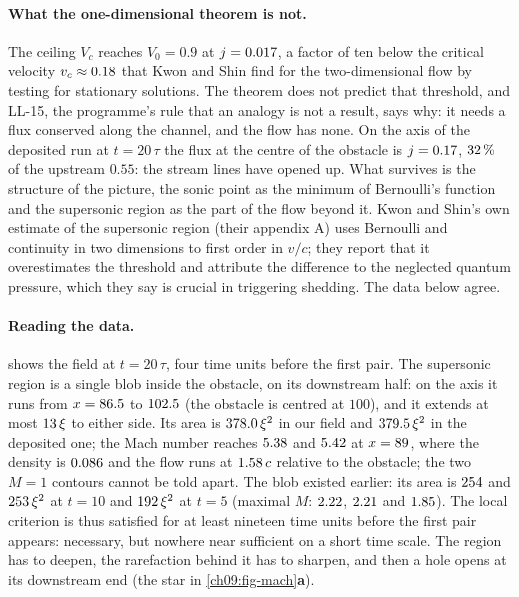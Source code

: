 \paragraph{What the one-dimensional theorem is not.} The ceiling $V_c$ reaches $V_0=0.9$ at $j=0.017$, a factor of ten below the critical velocity $v_c\approx0.18$ that Kwon and Shin find for the two-dimensional flow by testing for stationary solutions. The theorem does not predict that threshold, and LL-15, the programme's rule that an analogy is not a result, says why: it needs a flux conserved along the channel, and the flow has none. On the axis of the deposited run at $t=20\,\tau$ the flux at the centre of the obstacle is $j=0.17$, $32\,\%$ of the upstream $0.55$: the stream lines have opened up. What survives is the structure of the picture, the sonic point as the minimum of Bernoulli's function and the supersonic region as the part of the flow beyond it. Kwon and Shin's own estimate of the supersonic region (their appendix A) uses Bernoulli and continuity in two dimensions to first order in $v/c$; they report that it overestimates the threshold and attribute the difference to the neglected quantum pressure, which they say is crucial in triggering shedding. The data below agree.

\paragraph{Reading the data.}  shows the field at $t=20\,\tau$, four time units before the first pair. The supersonic region is a single blob inside the obstacle, on its downstream half: on the axis it runs from $x=86.5$ to $102.5$ (the obstacle is centred at $100$), and it extends at most $13\,\xi$ to either side. Its area is $378.0\,\xi^2$ in our field and $379.5\,\xi^2$ in the deposited one; the Mach number reaches $5.38$ and $5.42$ at $x=89$, where the density is $0.086$ and the flow runs at $1.58\,c$ relative to the obstacle; the two $M=1$ contours cannot be told apart. The blob existed earlier: its area is $254$ and $253\,\xi^2$ at $t=10$ and $192\,\xi^2$ at $t=5$ (maximal $M$: $2.22$, $2.21$ and $1.85$). The local criterion is thus satisfied for at least nineteen time units before the first pair appears: necessary, but nowhere near sufficient on a short time scale. The region has to deepen, the rarefaction behind it has to sharpen, and then a hole opens at its downstream end (the star in \cref{ch09:fig-mach}\textbf{a}).

